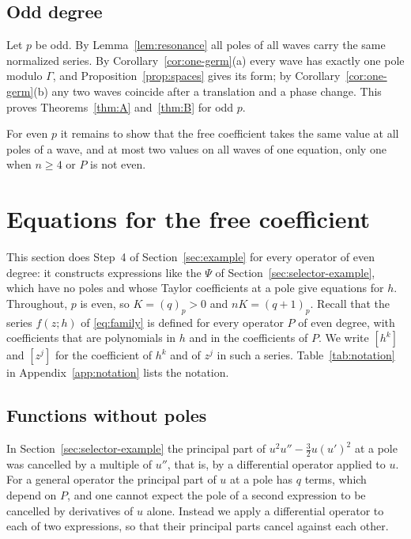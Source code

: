 \documentclass[11pt]{article}
\theoremstyle{definition}
\theoremstyle{remark}
\numberwithin{equation}{section}
\begin{document}
\subsection{Odd degree}\label{sec:odd}

Let \(p\) be odd. By Lemma~\ref{lem:resonance} all poles of all waves
carry the same normalized series. By Corollary~\ref{cor:one-germ}(a)
every wave has exactly one pole modulo \(\Gamma\), and
Proposition~\ref{prop:spaces} gives its form; by
Corollary~\ref{cor:one-germ}(b) any two waves coincide after a
translation and a phase change. This proves Theorems~\ref{thm:A}
and~\ref{thm:B} for odd \(p\).

For even \(p\) it remains to show\label{rem:remains} that the free
coefficient takes the same value at all poles of a wave, and at most
two values on all waves of one equation, only one when \(n\ge4\) or
\(P\) is not even.

\section{Equations for the free coefficient}\label{sec:selectors}

This section does Step~4 of Section~\ref{sec:example} for every operator of even degree: it
constructs expressions like the \(\Psi\) of
Section~\ref{sec:selector-example}, which have no poles and whose
Taylor coefficients at a pole give equations for \(h\). Throughout,
\(p\) is even, so \(K=(q)_p>0\) and \(nK=(q+1)_p\). Recall that the
series \(f(z;h)\) of \eqref{eq:family} is defined for every operator
\(P\) of even degree, with coefficients that are polynomials in \(h\)
and in the coefficients of \(P\). We write \([h^k]\) and \([z^j]\) for
the coefficient of \(h^k\) and of \(z^j\) in such a series.
Table~\ref{tab:notation} in Appendix~\ref{app:notation} lists the
notation.

\subsection{Functions without poles}

In Section~\ref{sec:selector-example} the principal part of
\(u^2u''-\tfrac32u(u')^2\) at a pole was cancelled by a multiple of
\(u''\), that is, by a differential operator applied to \(u\). For a
general operator the principal part of \(u\) at a pole has \(q\) terms,
which depend on \(P\), and one cannot expect the pole of a second
expression to be cancelled by derivatives of \(u\) alone. Instead we
apply a differential operator to each of two expressions, so that
their principal parts cancel against each other.
\end{document}
